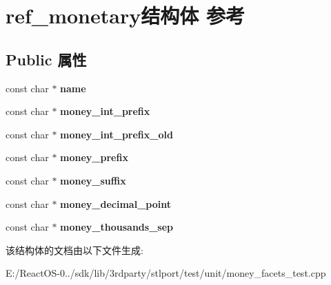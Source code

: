 \hypertarget{structref__monetary}{}\section{ref\+\_\+monetary结构体 参考}
\label{structref__monetary}
\subsection*{Public 属性}
\begin{DoxyCompactItemize}
\item 
\mbox{\label{structref__monetary_a785ce678e785670dc365f8ca04aac6cf}} 
const char $\ast$ {\bfseries name}
\item 
\mbox{\label{structref__monetary_a6022ca1af69064d3c03dd8ace70cdea5}} 
const char $\ast$ {\bfseries money\+\_\+int\+\_\+prefix}
\item 
\mbox{\label{structref__monetary_aaf0f4f129cf85d98254909349f17e976}} 
const char $\ast$ {\bfseries money\+\_\+int\+\_\+prefix\+\_\+old}
\item 
\mbox{\label{structref__monetary_a5ec4bccc28e412b05d922557a3dd1556}} 
const char $\ast$ {\bfseries money\+\_\+prefix}
\item 
\mbox{\label{structref__monetary_ab6c210cfc2d1929ca9b785d383d050b1}} 
const char $\ast$ {\bfseries money\+\_\+suffix}
\item 
\mbox{\label{structref__monetary_a286ce25dcecfa50bdb070f5fa58bdb6d}} 
const char $\ast$ {\bfseries money\+\_\+decimal\+\_\+point}
\item 
\mbox{\label{structref__monetary_ad26f3960b29a97d6fcef459b6fac5dec}} 
const char $\ast$ {\bfseries money\+\_\+thousands\+\_\+sep}
\end{DoxyCompactItemize}


该结构体的文档由以下文件生成\+:\begin{DoxyCompactItemize}
\item 
E\+:/\+React\+O\+S-\/0../sdk/lib/3rdparty/stlport/test/unit/money\+\_\+facets\+\_\+test.\+cpp\end{DoxyCompactItemize}
